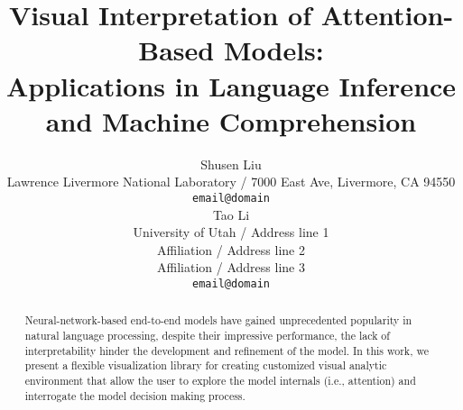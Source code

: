 \documentclass[11pt,a4paper]{article}
\title{Visual Interpretation of Attention-Based Models: \\ Applications in Language Inference and Machine Comprehension}
\author{Shusen Liu \\
  Lawrence Livermore National Laboratory  / 7000 East Ave, Livermore, CA 94550 \\
  {\tt email@domain} \\\And
  Tao Li \\
  University of Utah / Address line 1 \\
  Affiliation / Address line 2 \\
  Affiliation / Address line 3 \\
  {\tt email@domain} \\}
\date{}
\begin{document}
\maketitle

\begin{abstract}
Neural-network-based end-to-end models have gained unprecedented popularity in natural language processing, despite their impressive performance, the lack of interpretability hinder the development and refinement of the model.
%
In this work, we present a flexible visualization library for creating customized visual analytic environment that allow the user to explore the model internals (i.e., attention) and interrogate the model decision making process.
 
\end{abstract}









\end{document}
